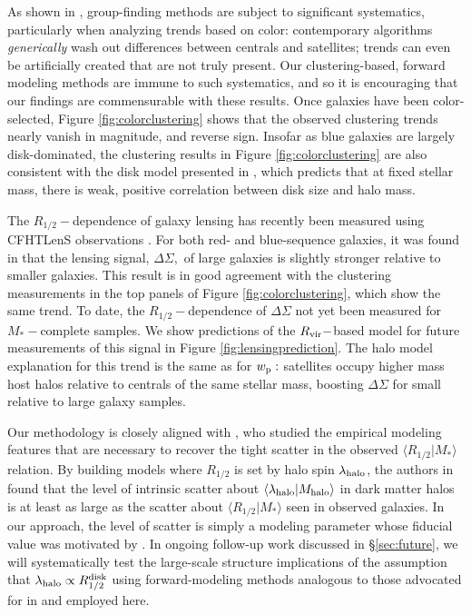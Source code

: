 \documentclass[usenatbib,usegraphicx,letterpaper]{mn2e}
\newcommand{\rhalf}{R_{1/2}}
\newcommand{\mstar}{M_{\ast}}
\newcommand{\mhalo}{M_{\rm halo}}
\newcommand{\rvir}{R_{\rm vir}}
\newcommand{\wproj}{w_{\rm p}}
\newcommand{\mean}[2]{\langle{#1}\vert{#2}\rangle}
\begin{document}
As shown in \citet{campbell_etal15}, group-finding methods are subject to significant systematics, particularly when analyzing trends based on color: contemporary algorithms {\em generically} wash out differences between centrals and satellites; trends can even be artificially created that are not truly present. Our clustering-based, forward modeling methods are immune to such systematics, and so it is encouraging that our findings are commensurable with these results. Once galaxies have been color-selected, Figure \ref{fig:colorclustering} shows that the observed clustering trends nearly vanish in magnitude, and reverse sign. Insofar as blue galaxies are largely disk-dominated, the clustering results in Figure \ref{fig:colorclustering} are also consistent with the disk model presented in \citet{dutton_etal08,dutton_etal10}, which predicts that at fixed stellar mass, there is weak, positive correlation between disk size and halo mass. 

The $\rhalf-$dependence of galaxy lensing has recently been measured using CFHTLenS observations \citep{heymans_etal12,erben_etal13}. For both red- and blue-sequence galaxies, it was found in \citet{charlton_etal17} that the lensing signal, $\Delta\Sigma,$ of large galaxies is slightly stronger relative to smaller galaxies. This result is in good agreement with the clustering measurements in the top panels of Figure \ref{fig:colorclustering}, which show the same trend. To date, the $\rhalf-$dependence of $\Delta\Sigma$ not yet been measured for $\mstar-$complete samples. We show  predictions of the $\rvir-$based model for future measurements of this signal in Figure \ref{fig:lensingprediction}. The halo model explanation for this trend is the same as for $\wproj:$ satellites occupy higher mass host halos relative to centrals of the same stellar mass, boosting $\Delta\Sigma$ for small relative to large galaxy samples.

Our methodology is closely aligned with \citet{somerville_etal17}, who studied the empirical modeling features that are necessary to recover the tight scatter in the observed $\mean{\rhalf}{\mstar}$ relation. By building models where $\rhalf$ is set by halo spin $\lambda_{\rm halo}$, the authors in \citet{somerville_etal17} found that the level of intrinsic scatter about $\langle\lambda_{\rm halo}\vert\mhalo\rangle$ in dark matter halos is at least as large as the scatter about $\langle\rhalf\vert\mstar\rangle$ seen in observed galaxies. In our approach, the level of scatter is simply a modeling parameter whose fiducial value was motivated by \citet{somerville_etal17}. In ongoing follow-up work discussed in \S\ref{sec:future}, we will systematically test the large-scale structure implications of the assumption that $\lambda_{\rm halo}\propto\rhalf^{\rm disk}$ using forward-modeling methods analogous to those advocated for in \citet{somerville_etal17} and employed here.
\end{document}
